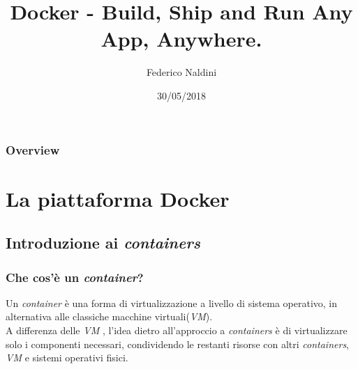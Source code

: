 \documentclass{beamer}
\title[Docker]{Docker - Build, Ship and Run Any App, Anywhere. } %
\author{Federico Naldini} %
\institute[Università di Bologna] %
{
Alma Mater Studiorum - Università di Bologna, Cesena. \\ %
\medskip
\textit{federico.naldini3@studio.unibo.it} %
}
\date{30/05/2018} %
\begin{document}
\begin{frame}
\titlepage %
\end{frame}

\begin{frame}
\frametitle{Overview} %
\tableofcontents %
\end{frame}

\section{La piattaforma Docker} %

\subsection{Introduzione ai \textit{containers}}


\begin{frame}
\frametitle{Che cos'è un \textit{container}?}
Un \textit{container} è una forma di virtualizzazione a livello di sistema operativo, in alternativa alle classiche macchine virtuali(\textit{VM}).\\
A differenza delle \textit{VM} , l'idea dietro all'approccio a \textit{containers} è di virtualizzare solo i componenti necessari, condividendo le restanti risorse con altri \textit{containers}, \textit{VM} e sistemi operativi fisici.
\end{frame}
\end{document}
